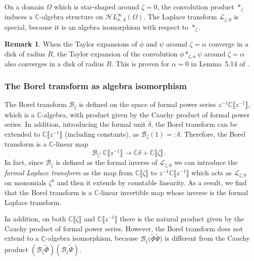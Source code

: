 \documentclass{article}
\newcommand{\singexp}[2]{\mathcal{H}L^\infty_{#1, #2}}
\newcommand{\C}{\mathbb{C}}
\newcommand{\series}[1]{\tilde{#1}}
\newcommand{\laplace}{\mathcal{L}}
\newcommand{\borel}{\mathcal{B}}
\theoremstyle{definition}
\newtheorem{remark}[definition]{Remark}
\theoremstyle{plain}
\begin{document}
On a domain $\Omega$ which is star-shaped around $\zeta = 0$, the convolution product $\ast_{\zeta}$ induces a $\C$-algebra structure on $\singexp{\sigma}{\Lambda}(\Omega)$. The Laplace transform $\laplace_{\zeta, 0}$ is special, because it is an algebra isomorphism with respect to $\ast_{\zeta}$.
\begin{remark}
When the Taylor expansions of $\phi$ and $\psi$ around $\zeta=\alpha$ converge in a disk of radius $R$, the Taylor expansion of the convolution $\phi\ast_{\zeta,\alpha}\psi$ around $\zeta=\alpha$ also converges in a disk of radius $R$. This is proven for $\alpha = 0$ in Lemma~5.14 of \cite{diverg-resurg-i}.
\end{remark}
%
\subsubsection*{The Borel transform as algebra isomorphism}
%
The Borel transform $\borel_\zeta$ is defined on the space of formal power series $z^{-1}\C\llbracket z^{-1}\rrbracket$, which is a $\C$-algebra, with product given by the Cauchy product of formal power series. In addition, introducing the formal unit $\delta$, the Borel transform can be extended to $\C\llbracket z^{-1}\rrbracket$ (including constants), as $\borel_\zeta(1)=:\delta$. Therefore, the Borel transform is a $\C$-linear map
 \[\borel_\zeta\colon\C\llbracket z^{-1}\rrbracket\to\C\delta + \C\llbracket\zeta\rrbracket\,.\] 
In fact, since $\borel_\zeta$ is defined as the formal inverse of $\laplace_{\zeta,0}$ we can introduce the \textit{formal Laplace transform} as the map from $\C\llbracket \zeta\rrbracket$ to $z^{-1}\C\llbracket z^{-1}\rrbracket$ which acts as $\laplace_{\zeta,0}$ on monomials $\zeta^k$ and then it extends by countable linearity. As a result, we find that the Borel transform is a $\C$-linear invertible map whose inverse is the formal Laplace transform.

In addition, on both $\C\llbracket\zeta\rrbracket$ and $\C\llbracket z^{-1}\rrbracket$ there is the natural product given by the Cauchy product of formal power series. However, the Borel transform does not extend to a $\C$-algebra isomorphism, because $\borel_\zeta\big(\series{\Phi}\series{\Psi}\big)$ is different from the Cauchy product $(\borel_\zeta \series{\Phi})(\borel_\zeta \series{\Psi})$.
\end{document}
